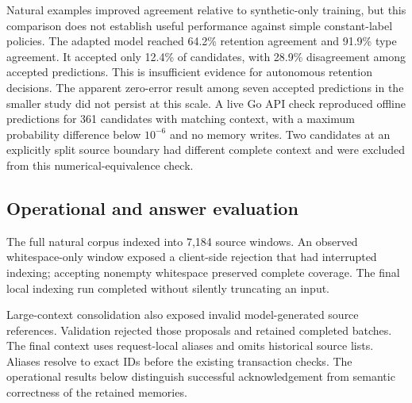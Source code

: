 \noindent\begin{minipage}{\linewidth}
Natural examples improved agreement relative to synthetic-only training, but
this comparison does not establish useful performance against simple
constant-label policies. The adapted model reached 64.2\% retention agreement
and 91.9\% type agreement. It accepted only 12.4\% of candidates, with 28.9\%
disagreement among accepted predictions. This is insufficient evidence for
autonomous retention decisions. The apparent zero-error result among seven
accepted predictions in the smaller study did not persist at this scale. A live Go API check reproduced offline predictions for
361 candidates with matching context, with a maximum probability difference
below $10^{-6}$ and no memory writes. Two candidates at an explicitly split
source boundary had different complete context and were excluded from this
numerical-equivalence check.
\end{minipage}



\subsection{Operational and answer evaluation}
The full natural corpus indexed into 7,184 source windows. An observed
whitespace-only window exposed a client-side rejection that had interrupted
indexing; accepting nonempty whitespace preserved complete coverage. The final
local indexing run completed without silently truncating an input.

Large-context consolidation also exposed invalid model-generated source
references. Validation rejected those proposals and retained completed batches.
The final context uses request-local aliases and omits historical source lists.
Aliases resolve to exact IDs before the existing transaction checks. The
operational results below distinguish successful acknowledgement from semantic
correctness of the retained memories.


